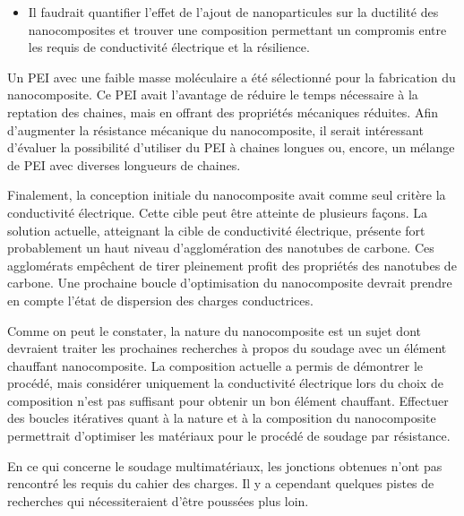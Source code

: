 \begin{itemize}
	\item Il faudrait quantifier l'effet de l'ajout de nanoparticules sur la ductilité des nanocomposites et trouver une composition permettant un compromis entre les requis de conductivité électrique et la résilience. 
\end{itemize}

Un PEI avec une faible masse moléculaire a été sélectionné pour la fabrication du nanocomposite. 
Ce PEI avait l'avantage de réduire le temps nécessaire à la reptation des chaines, mais en offrant des propriétés mécaniques réduites. 
Afin d'augmenter la résistance mécanique du nanocomposite, il serait intéressant d'évaluer la possibilité d'utiliser du PEI à chaines longues ou, encore, un mélange de PEI avec diverses longueurs de chaines. 

Finalement, la conception initiale du nanocomposite avait comme seul critère la conductivité électrique. 
Cette cible peut être atteinte de plusieurs façons. 
La solution actuelle, atteignant la cible de conductivité électrique, présente fort probablement un haut niveau d'agglomération des nanotubes de carbone. 
Ces agglomérats empêchent de tirer pleinement profit des propriétés des nanotubes de carbone. 
Une prochaine boucle d'optimisation du nanocomposite devrait prendre en compte l'état de dispersion des charges conductrices. 

Comme on peut le constater, la nature du nanocomposite est un sujet dont devraient traiter les prochaines recherches à propos du soudage avec un élément chauffant nanocomposite. 
La composition actuelle a permis de démontrer le procédé, mais considérer uniquement la conductivité électrique lors du choix de composition n'est pas suffisant pour obtenir un bon élément chauffant.
Effectuer des boucles itératives quant à la nature et à la composition du nanocomposite permettrait d'optimiser les matériaux pour le procédé de soudage par résistance. 

En ce qui concerne le soudage multimatériaux, les jonctions obtenues n'ont pas rencontré les requis du cahier des charges. 
Il y a cependant quelques pistes de recherches qui nécessiteraient d'être poussées plus loin. 

